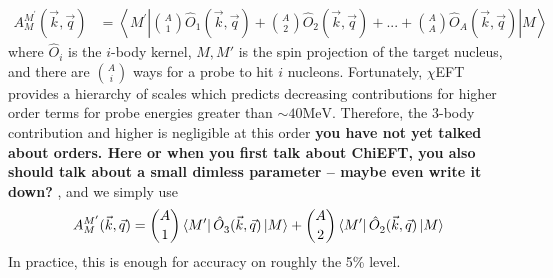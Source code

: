 \documentclass[a4paper,11pt]{article}
\newcommand\bv[1]{\vec{#1}}
\newcommand{\com}[1]{\color{blue}\small\textbf{ #1 }\color{black}\normalsize}
\newcommand{\MeV}{\mathrm{MeV}}
\begin{document}
\begin{align}
  A_{M}^{M^{\prime} }(\bv{k}, \bv{q})&=
 \left\langle M^{\prime}\left|
  \binom{A}{1} \hat{O}_{1}(\bv{k}, \bv{q}) +
  \binom{A}{2} \hat{O}_{2}(\bv{k}, \bv{q}) +... + 
  \binom{A}{A} \hat{O}_{A}(\bv{k}, \bv{q})
  \right|M
  \right\rangle
\end{align}
where $\hat{O}_i$ is the $i$-body kernel, $M,M'$ is the spin projection of the
target nucleus, and there are
$\binom{A}{i}$ ways for a probe to hit $i$ nucleons. Fortunately,
$\chi$EFT provides a hierarchy of scales which predicts decreasing
contributions for higher order terms for probe energies greater than
$\sim 40 \MeV$.
Therefore, the 3-body contribution and higher is negligible at this
order\com{you have not yet talked about orders. Here or when you first talk about ChiEFT, you also should talk about a small dimless parameter -- maybe even write it down?}, and we simply use
\begin{equation}
  A_{M}^{M^{\prime} }(\bv{k}, \bv{q})=\binom{A}{1}\left\langle
  M^{\prime}\right|\hat{O}_{3}^{}(\bv{k}, \bv{q})\left|M\right
  \rangle + \binom{A}{2} \left\langle
  M^{\prime}\right|\hat{O}_{2}^{}(\bv{k}, \bv{q}) \left|
  M\right\rangle\nonumber\\
\end{equation}
In practice, this is enough for accuracy on roughly the 5\% level.
\end{document}
